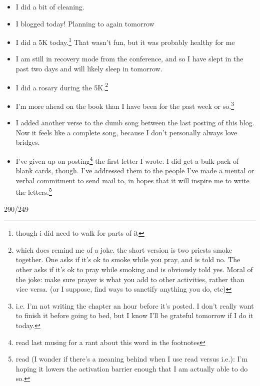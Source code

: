 \documentclass[12pt]{article}[titlepage]
\newcommand{\1}{\={a}}
\newcommand{\2}{\={e}}
\newcommand{\3}{\={\i}}
\newcommand{\4}{\=o}
\newcommand{\5}{\=u}
\newcommand{\6}{\={A}}
\renewcommand{\,}{\textsuperscript{,}}
\begin{document}
\begin{itemize}
\item I did a bit of cleaning.
\item I blogged today! Planning to again tomorrow
\item I did a 5K today.\footnote{though i did need to walk for parts of it} That wasn't fun, but it was probably healthy for me
\item I am still in recovery mode from the conference, and so I have slept in the past two days and will likely sleep in tomorrow.
\item I did a rosary during the 5K.\footnote{which does remind me of a joke. the short version is two priests smoke together. One asks if it's ok to smoke while you pray, and is told no. The other asks if it's ok to pray while smoking and is obviously told yes. Moral of the joke: make sure prayer is what you add to other activities, rather than vice versa. (or I suppose, find ways to sanctify anything you do, etc)}
\item I'm more ahead on the book than I have been for the past week or so.\footnote{i.e. I'm not writing the chapter an hour before it's posted. I don't really want to finish it before going to bed, but I know I'll be grateful tomorrow if I do it today.}
\item I added another verse to the dumb song between the last posting of this blog. Now it feels like a complete song, because I don't personally always love bridges.
\item I've given up on posting\footnote{read last musing for a rant about this word in the footnotes} the first letter I wrote. I did get a bulk pack of blank cards, though. I've addressed them to the people I've made a mental or verbal commitment to send mail to, in hopes that it will inspire me to write the letters.\footnote{read (I wonder if there's a meaning behind when I use read versus i.e.): I'm hoping it lowers the activation barrier enough that I am actually able to do so.}
\end{itemize}

290/249
\end{document}
